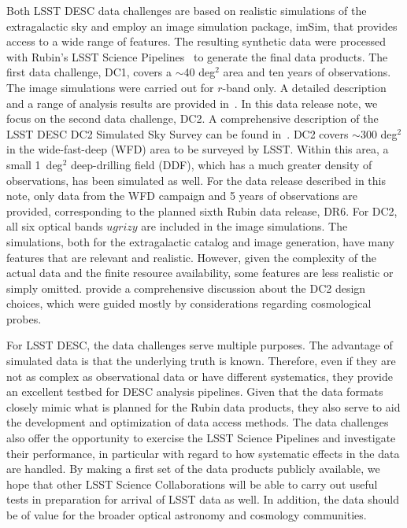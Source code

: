 \documentclass[modern]{descnote}
\begin{document}
Both LSST DESC data challenges are based on realistic simulations of the extragalactic sky and employ an image simulation package, imSim, that provides access to a wide range of features. The resulting synthetic data were processed with Rubin's LSST Science Pipelines~\citep{2017ASPC..512..279J} to generate the final data products. The first data challenge, DC1, covers a $\sim$40 deg$^2$ area and ten years of observations. The image simulations were carried out for $r$-band only. A detailed description and a range of analysis results are provided in~\cite{dc1}.  In this data release note, we focus on the second data challenge, DC2. A comprehensive description of the LSST DESC DC2 Simulated Sky Survey can be found in~\cite{2020arXiv201005926L}. DC2 covers $\sim$300 deg$^2$ in the wide-fast-deep (WFD) area to be surveyed by LSST. Within this area, a small 1~deg$^2$ deep-drilling field (DDF), which has a much greater density of observations, has been simulated as well. For the data release described in this note, only data from the WFD campaign and 5 years of observations are provided, corresponding to the planned sixth Rubin data release, DR6. For DC2, all six optical bands $ugrizy$ are included in the image simulations. The simulations, both for the extragalactic catalog and image generation, have many features that are relevant and realistic. However, given the complexity of the actual data and the finite resource availability, some features are less realistic or simply omitted. \cite{2020arXiv201005926L} provide a comprehensive discussion about the DC2 design choices, which were guided mostly by considerations regarding cosmological probes.  

For LSST DESC, the data challenges serve multiple purposes. The advantage of simulated data is that the underlying truth is known. Therefore, even if they are not as complex as observational data or have different systematics, they provide an excellent testbed for DESC analysis pipelines. Given that the data formats closely mimic what is planned for the Rubin data products, they also serve to aid the development and optimization of data access methods. The data challenges also offer the opportunity to exercise the LSST Science Pipelines and investigate their performance, in particular with regard to how systematic effects in the data are handled. By making a first set of the data products publicly available, we hope that other LSST Science Collaborations will be able to carry out useful tests in preparation for arrival of LSST data as well. In addition, the data should be of value for the broader optical astronomy and cosmology communities.
\end{document}
